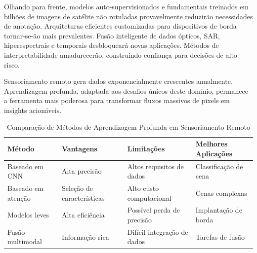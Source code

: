 \documentclass[12pt,a4paper]{article}
\begin{document}
Olhando para frente, modelos auto-supervisionados e fundamentais treinados em bilhões de imagens de satélite não rotuladas provavelmente reduzirão necessidades de anotação. Arquiteturas eficientes customizadas para dispositivos de borda tornar-se-ão mais prevalentes. Fusão inteligente de dados ópticos, SAR, hiperespectrais e temporais desbloqueará novas aplicações. Métodos de interpretabilidade amadurecerão, construindo confiança para decisões de alto risco.

Sensoriamento remoto gera dados exponencialmente crescentes anualmente. Aprendizagem profunda, adaptada aos desafios únicos deste domínio, permanece a ferramenta mais poderosa para transformar fluxos massivos de pixels em insights acionáveis.

\begin{table}[htbp]
\centering
\caption{Comparação de Métodos de Aprendizagem Profunda em Sensoriamento Remoto}
\label{tab:comparison}
\begin{tabular}{@{}llll@{}}
\toprule
\textbf{Método} & \textbf{Vantagens} & \textbf{Limitações} & \textbf{Melhores Aplicações} \\
\midrule
Baseado em CNN & Alta precisão & Altos requisitos de dados & Classificação de cena \\
Baseado em atenção & Seleção de características & Alto custo computacional & Cenas complexas \\
Modelos leves & Alta eficiência & Possível perda de precisão & Implantação de borda \\
Fusão multimodal & Informação rica & Difícil integração de dados & Tarefas de fusão \\
\bottomrule
\end{tabular}
\end{table}
\end{document}
